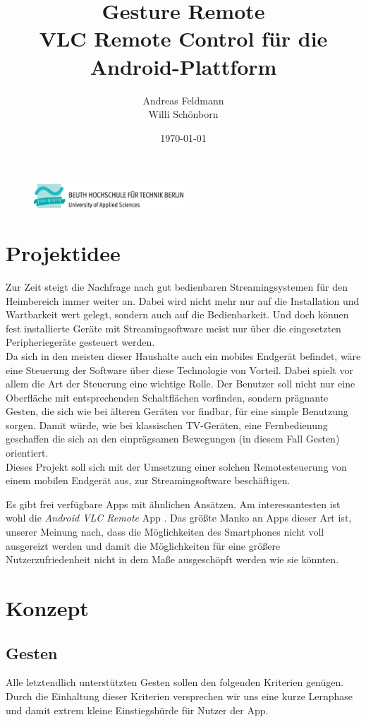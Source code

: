 \documentclass[a4paper,12pt]{article}
\title{Gesture Remote \\ VLC Remote Control für die Android-Plattform}
\author{Andreas Feldmann \\ Willi Schönborn}
\date{\today}
\begin{document}
\begin{figure}[H]
\centering
\includegraphics[width=0.5\textwidth]{beuth.eps}
\maketitle
\end{figure}
\newpage
\tableofcontents
\newpage
\section{Projektidee}
Zur Zeit steigt die Nachfrage nach gut bedienbaren Streamingsystemen für den Heimbereich immer weiter an. Dabei wird nicht mehr nur auf die Installation und Wartbarkeit wert gelegt, sondern auch auf die Bedienbarkeit. Und doch können fest installierte Geräte mit Streamingsoftware meist nur über die eingesetzten Peripheriegeräte gesteuert werden. \\
Da sich in den meisten dieser Haushalte auch ein mobiles Endgerät befindet, wäre eine Steuerung der Software über diese Technologie von Vorteil. Dabei spielt vor allem die Art der Steuerung eine wichtige Rolle. Der Benutzer soll nicht nur eine Oberfläche mit entsprechenden Schaltflächen vorfinden, sondern prägnante Gesten, die sich wie bei älteren Geräten vor findbar, für eine simple Benutzung sorgen. Damit würde, wie bei klassischen TV-Geräten, eine Fernbedienung geschaffen die sich an den einprägsamen Bewegungen (in diesem Fall Gesten) orientiert. \\
Dieses Projekt soll sich mit der Umsetzung einer solchen Remotesteuerung von einem mobilen Endgerät aus, zur Streamingsoftware beschäftigen.

Es gibt frei verfügbare Apps mit ähnlichen Ansätzen. Am interessantesten ist wohl die \textit{Android VLC Remote} App \cite{android-vlc-remote}. Das größte Manko an Apps dieser Art ist, unserer Meinung nach, dass die Möglichkeiten des Smartphones nicht voll ausgereizt werden und damit die Möglichkeiten für eine größere Nutzerzufriedenheit nicht in dem Maße ausgeschöpft werden wie sie könnten.

\newpage
\section{Konzept}

\subsection{Gesten}
Alle letztendlich unterstützten Gesten sollen den folgenden Kriterien genügen. Durch die Einhaltung dieser Kriterien versprechen wir uns eine kurze Lernphase und damit extrem kleine Einstiegshürde für Nutzer der App.
\end{document}
